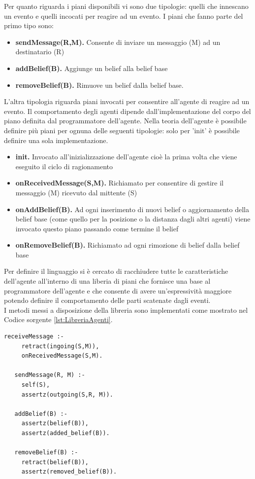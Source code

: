 \documentclass[12pt,a4paper,openright,twoside]{report}
\begin{document}
Per quanto riguarda i piani disponibili vi sono due tipologie: quelli che innescano un evento e quelli incocati per reagire ad un evento.
I piani che fanno parte del primo tipo sono:
\begin{itemize}
   \item \textbf{sendMessage(R,M).} Consente di inviare un messaggio (M) ad un destinatario (R)
   \item \textbf{addBelief(B).} Aggiunge un belief alla belief base
   \item \textbf{removeBelief(B).} Rimuove un belief dalla belief base.
\end{itemize}
L'altra tipologia riguarda piani invocati per consentire all'agente di reagire ad un evento. Il comportamento degli agenti dipende dall'implementazione del corpo del piano definita dal programmatore dell'agente. Nella teoria dell'agente \`e possibile definire pi\`u piani per ognuna delle seguenti tipologie: solo per 'init' \`e possibile definire una sola implementazione.
\begin{itemize}
   \item \textbf{init.} Invocato all'inizializzazione dell'agente cio\`e la prima volta che viene eseguito il ciclo di ragionamento
   \item \textbf{onReceivedMessage(S,M).} Richiamato per consentire di gestire il messaggio (M) ricevuto dal mittente (S)
   \item \textbf{onAddBelief(B).} Ad ogni inserimento di nuovi belief o aggiornamento della belief base (come quello per la posizione o la distanza dagli altri agenti) viene invocato questo piano passando come termine il belief
   \item \textbf{onRemoveBelief(B).} Richiamato ad ogni rimozione di belief dalla belief base
\end{itemize}

Per definire il linguaggio si \`e cercato di racchiudere tutte le caratteristiche dell'agente all'interno di una liberia di piani che fornisce una base al programmatore dell'agente e che consente di avere un'espressivit\`a maggiore potendo definire il comportamento delle parti scatenate dagli eventi.
\\
I metodi messi a disposizione della libreria sono implementati come mostrato nel Codice sorgente \ref{lst:LibreriaAgenti}.
\medskip
\begin{lstlisting}[firstnumber=1,label={lst:LibreriaAgenti},caption={Libreria agenti}]
   receiveMessage :-
     retract(ingoing(S,M)),
     onReceivedMessage(S,M).

   sendMessage(R, M) :-
     self(S),
     assertz(outgoing(S,R, M)).

   addBelief(B) :-
     assertz(belief(B)),
     assertz(added_belief(B)).

   removeBelief(B) :-
     retract(belief(B)),
     assertz(removed_belief(B)).
\end{lstlisting}
\end{document}
